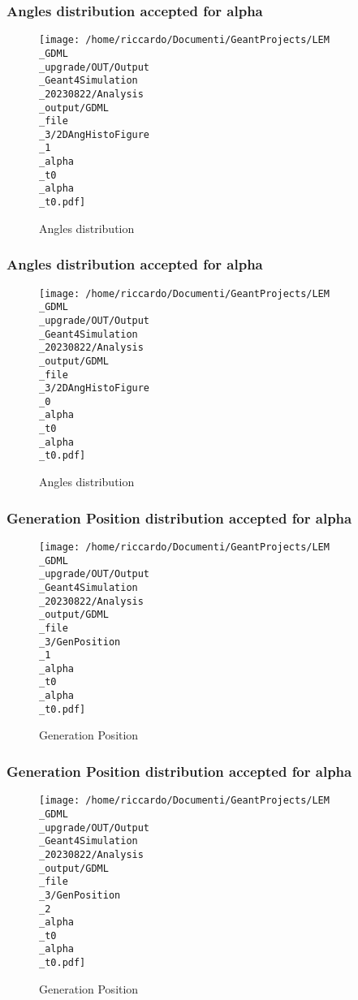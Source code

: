 \documentclass[8pt]{beamer}
\begin{document}
            \begin{frame}
                \frametitle{Angles distribution accepted for alpha}
            
        \begin{figure}[h]
            \centering
            \texttt{[image: /home/riccardo/Documenti/GeantProjects/LEM\\\_GDML\\\_upgrade/OUT/Output\\\_Geant4Simulation\\\_20230822/Analysis\\\_output/GDML\\\_file\\\_3/2DAngHistoFigure\\\_1\\\_alpha\\\_t0\\\_alpha\\\_t0.pdf]}
            \caption{Angles distribution}
        \end{figure}
        
            \end{frame}
            
            \begin{frame}
                \frametitle{Angles distribution accepted for alpha}
            
        \begin{figure}[h]
            \centering
            \texttt{[image: /home/riccardo/Documenti/GeantProjects/LEM\\\_GDML\\\_upgrade/OUT/Output\\\_Geant4Simulation\\\_20230822/Analysis\\\_output/GDML\\\_file\\\_3/2DAngHistoFigure\\\_0\\\_alpha\\\_t0\\\_alpha\\\_t0.pdf]}
            \caption{Angles distribution}
        \end{figure}
        
            \end{frame}
            
            \begin{frame}
                \frametitle{Generation Position distribution accepted for alpha}
            
        \begin{figure}[h]
            \centering
            \texttt{[image: /home/riccardo/Documenti/GeantProjects/LEM\\\_GDML\\\_upgrade/OUT/Output\\\_Geant4Simulation\\\_20230822/Analysis\\\_output/GDML\\\_file\\\_3/GenPosition\\\_1\\\_alpha\\\_t0\\\_alpha\\\_t0.pdf]}
            \caption{Generation Position}
        \end{figure}
        
            \end{frame}
            
            \begin{frame}
                \frametitle{Generation Position distribution accepted for alpha}
            
        \begin{figure}[h]
            \centering
            \texttt{[image: /home/riccardo/Documenti/GeantProjects/LEM\\\_GDML\\\_upgrade/OUT/Output\\\_Geant4Simulation\\\_20230822/Analysis\\\_output/GDML\\\_file\\\_3/GenPosition\\\_2\\\_alpha\\\_t0\\\_alpha\\\_t0.pdf]}
            \caption{Generation Position}
        \end{figure}
        
            \end{frame}
            
\end{document}
